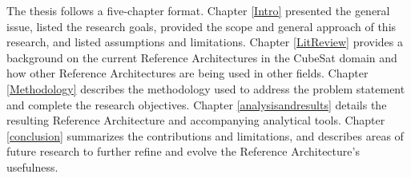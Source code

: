 The thesis follows a five-chapter format. Chapter \ref{Intro} presented the general issue, listed the research goals, provided the scope and general approach of this research, and listed assumptions and limitations. Chapter \ref{LitReview} provides a background on the current Reference Architectures in the CubeSat domain and how other Reference Architectures are being used in other fields. Chapter \ref{Methodology} describes the methodology used to address the problem statement and complete the research objectives. Chapter \ref{analysisandresults} details the resulting Reference Architecture and accompanying analytical tools. Chapter \ref{conclusion} summarizes the contributions and limitations, and describes areas of future research to further refine and evolve the Reference Architecture’s usefulness. 